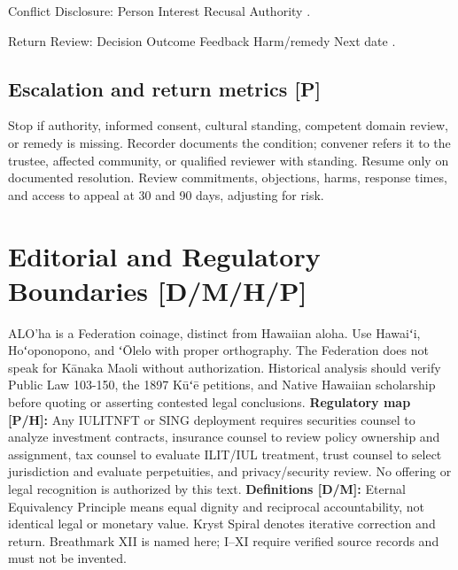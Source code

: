 \documentclass[12pt]{article}
\begin{document}
Conflict Disclosure: Person \underline{\hspace{2cm}} Interest \underline{\hspace{2cm}} Recusal \underline{\hspace{2cm}} Authority \underline{\hspace{2cm}}.

Return Review: Decision \underline{\hspace{2cm}} Outcome \underline{\hspace{2cm}} Feedback \underline{\hspace{2cm}} Harm/remedy \underline{\hspace{2cm}} Next date \underline{\hspace{2cm}}.

\subsection{Escalation and return metrics [P]}
Stop if authority, informed consent, cultural standing, competent domain review, or remedy is missing. Recorder documents the condition; convener refers it to the trustee, affected community, or qualified reviewer with standing. Resume only on documented resolution. Review commitments, objections, harms, response times, and access to appeal at 30 and 90 days, adjusting for risk.

\section{Editorial and Regulatory Boundaries [D/M/H/P]}
ALO'ha is a Federation coinage, distinct from Hawaiian aloha. Use Hawaiʻi, Hoʻoponopono, and ʻŌlelo with proper orthography. The Federation does not speak for Kānaka Maoli without authorization. Historical analysis should verify Public Law 103-150, the 1897 Kūʻē petitions, and Native Hawaiian scholarship before quoting or asserting contested legal conclusions.
\textbf{Regulatory map [P/H]:} Any IULITNFT or SING deployment requires securities counsel to analyze investment contracts, insurance counsel to review policy ownership and assignment, tax counsel to evaluate ILIT/IUL treatment, trust counsel to select jurisdiction and evaluate perpetuities, and privacy/security review. No offering or legal recognition is authorized by this text.
\textbf{Definitions [D/M]:} Eternal Equivalency Principle means equal dignity and reciprocal accountability, not identical legal or monetary value. Kryst Spiral denotes iterative correction and return. Breathmark XII is named here; I--XI require verified source records and must not be invented.
\end{document}
